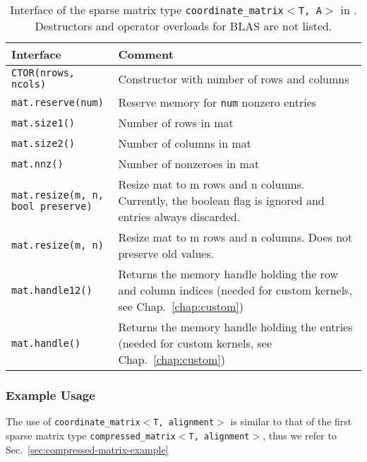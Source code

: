 \begin{table}[tb]
\begin{center}
\begin{tabular}{p{6.5cm}|p{8cm}}
Interface & Comment\\
\hline
\texttt{CTOR(nrows, ncols)}    & Constructor with number of rows and columns \\
\texttt{mat.reserve(num)}    & Reserve memory for \texttt{num} nonzero entries \\
\texttt{mat.size1()}            & Number of rows in mat \\
\texttt{mat.size2()}            & Number of columns in mat \\
\texttt{mat.nnz()}		& Number of nonzeroes in mat \\
\parbox{6cm}{\texttt{mat.resize(m, n, \\
           \hphantom{mat.resize(}bool preserve)}}    & Resize mat to m rows and n columns. Currently, the boolean flag is ignored and entries always discarded. \\
\texttt{mat.resize(m, n)}    & Resize mat to m rows and n columns. Does not preserve old values. \\
\texttt{mat.handle12()}  & Returns the memory handle holding the row and column indices (needed for custom kernels, see Chap.~\ref{chap:custom}) \\
\texttt{mat.handle()}  & Returns the memory handle holding the entries (needed for custom kernels, see Chap.~\ref{chap:custom})
\end{tabular}
\caption{Interface of the sparse matrix type \texttt{coordinate\_matrix$<$T, A$>$} in \ViennaCL. Destructors and operator overloads for BLAS are not listed.}
\label{tab:coordinate-matrix-interface}
\end{center}
\end{table}

\subsubsection{Example Usage}
The use of \texttt{coordinate\_matrix$<$T, alignment$>$} is similar to that of the first sparse matrix type 
\texttt{compressed\_matrix$<$T, alignment$>$}, thus we refer to Sec.~\ref{sec:compressed-matrix-example}


